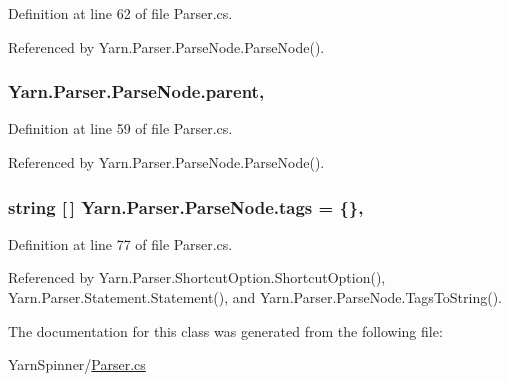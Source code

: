 Definition at line 62 of file Parser.\-cs.



Referenced by Yarn.\-Parser.\-Parse\-Node.\-Parse\-Node().

\hypertarget{a00150_af313a82103fcc2ff5a177dbb06b92f7b}{
\subsubsection[{parent}]{ Yarn.\-Parser.\-Parse\-Node.\-parent\hspace{0.3cm}{\ttfamily [package]}, {\ttfamily [inherited]}}}\label{a00150_af313a82103fcc2ff5a177dbb06b92f7b}


Definition at line 59 of file Parser.\-cs.



Referenced by Yarn.\-Parser.\-Parse\-Node.\-Parse\-Node().

\hypertarget{a00150_a58b3a15788fd2d4127d73619dc6d04ae}{
\subsubsection[{tags}]{\setlength{\rightskip}{0pt plus 5cm}string \mbox{[}$\,$\mbox{]} Yarn.\-Parser.\-Parse\-Node.\-tags = \{\}\hspace{0.3cm}{\ttfamily [package]}, {\ttfamily [inherited]}}}\label{a00150_a58b3a15788fd2d4127d73619dc6d04ae}


Definition at line 77 of file Parser.\-cs.



Referenced by Yarn.\-Parser.\-Shortcut\-Option.\-Shortcut\-Option(), Yarn.\-Parser.\-Statement.\-Statement(), and Yarn.\-Parser.\-Parse\-Node.\-Tags\-To\-String().



The documentation for this class was generated from the following file\-:\begin{DoxyCompactItemize}
\item 
Yarn\-Spinner/\hyperlink{a00316}{Parser.\-cs}\end{DoxyCompactItemize}
